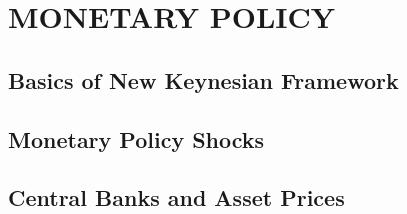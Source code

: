 \documentclass[
]{book}
\begin{document}
\hypertarget{part-monetary-policy}{%
\part*{MONETARY POLICY}\label{part-monetary-policy}}

\hypertarget{basics-of-new-keynesian-framework}{%
\chapter{Basics of New Keynesian Framework}\label{basics-of-new-keynesian-framework}}

\hypertarget{monetary-policy-shocks}{%
\chapter{Monetary Policy Shocks}\label{monetary-policy-shocks}}

\hypertarget{central-banks-and-asset-prices}{%
\chapter{Central Banks and Asset Prices}\label{central-banks-and-asset-prices}}

  
\end{document}
